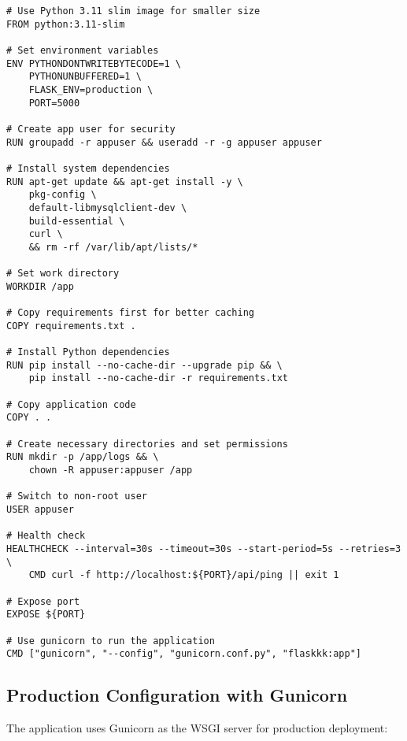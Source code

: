 \documentclass[12pt,a4paper]{report}
\begin{document}
\begin{lstlisting}[style=dockerstyle, caption=Application Dockerfile]
# Use Python 3.11 slim image for smaller size
FROM python:3.11-slim

# Set environment variables
ENV PYTHONDONTWRITEBYTECODE=1 \
    PYTHONUNBUFFERED=1 \
    FLASK_ENV=production \
    PORT=5000

# Create app user for security
RUN groupadd -r appuser && useradd -r -g appuser appuser

# Install system dependencies
RUN apt-get update && apt-get install -y \
    pkg-config \
    default-libmysqlclient-dev \
    build-essential \
    curl \
    && rm -rf /var/lib/apt/lists/*

# Set work directory
WORKDIR /app

# Copy requirements first for better caching
COPY requirements.txt .

# Install Python dependencies
RUN pip install --no-cache-dir --upgrade pip && \
    pip install --no-cache-dir -r requirements.txt

# Copy application code
COPY . .

# Create necessary directories and set permissions
RUN mkdir -p /app/logs && \
    chown -R appuser:appuser /app

# Switch to non-root user
USER appuser

# Health check
HEALTHCHECK --interval=30s --timeout=30s --start-period=5s --retries=3 \
    CMD curl -f http://localhost:${PORT}/api/ping || exit 1

# Expose port
EXPOSE ${PORT}

# Use gunicorn to run the application
CMD ["gunicorn", "--config", "gunicorn.conf.py", "flaskkk:app"]
\end{lstlisting}

\subsection{Production Configuration with Gunicorn}

The application uses Gunicorn as the WSGI server for production deployment:
\end{document}
